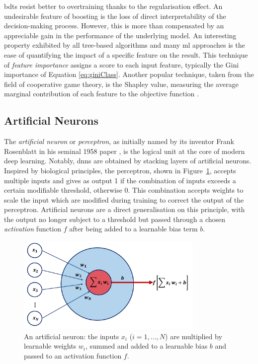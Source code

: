 \glspl{bdt} resist better to overtraining thanks to the regularisation effect. An undesirable feature of boosting is the loss of direct interpretability of the decision-making process. However, this is more than compensated by an appreciable gain in the performance of the underlying model. An interesting property exhibited by all tree-based algorithms and many \gls{ml} approaches is the ease of quantifying the impact of a specific feature on the result. This technique of \textit{feature importance} assigns a score to each input feature, typically the Gini importance of Equation \ref{eq:giniClass}. Another popular technique, taken from the field of cooperative game theory, is the Shapley value, measuring the average marginal contribution of each feature to the objective function \cite{shapley:book1952, Rozemberczki2022TheSV}.


\subsection{Artificial Neurons}
The \textit{artificial neuron} or \textit{perceptron}, as initially named by its inventor Frank Rosenblatt in his seminal 1958 paper \cite{rosenblatt1958perceptron}, is the logical unit at the core of modern deep learning. Notably, \glspl{dnn} are obtained by stacking layers of artificial neurons. Inspired by biological principles, the perceptron, shown in Figure~\ref{fig:annModel}, accepts multiple inputs and gives as output 1 if the combination of inputs exceeds a certain modifiable threshold, otherwise 0. This combination accepts weights to scale the input which are modified during training to correct the output of the perceptron. Artificial neurons are a direct generalisation on this principle, with the output no longer subject to a threshold but passed through a chosen \textit{activation} function $f$ after being added to a learnable bias term $b$. 

\begin{figure}[h!]
    \center
    \includegraphics[width=0.8\textwidth]{Images/ML/ann.png}
    \caption{An artificial neuron: the inputs $x_i$ ($i= 1, ..., N$) are multiplied by learnable weights $w_i$, summed and added to a learnable bias $b$ and passed to an activation function $f$.} 
    \label{fig:annModel}
\end{figure}

